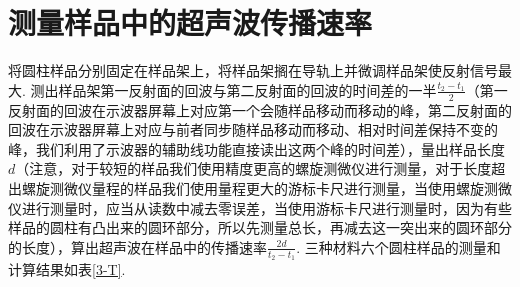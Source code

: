 \documentclass[UTF8,10pt,a4paper]{article}
\begin{document}
\section{测量样品中的超声波传播速率}
将圆柱样品分别固定在样品架上，将样品架搁在导轨上并微调样品架使反射信号最大. 测出样品架第一反射面的回波与第二反射面的回波的时间差的一半$\frac{t_2-t_1}{2}$（第一反射面的回波在示波器屏幕上对应第一个会随样品移动而移动的峰，第二反射面的回波在示波器屏幕上对应与前者同步随样品移动而移动、相对时间差保持不变的峰，我们利用了示波器的辅助线功能直接读出这两个峰的时间差），量出样品长度$d$（注意，对于较短的样品我们使用精度更高的螺旋测微仪进行测量，对于长度超出螺旋测微仪量程的样品我们使用量程更大的游标卡尺进行测量，当使用螺旋测微仪进行测量时，应当从读数中减去零误差，当使用游标卡尺进行测量时，因为有些样品的圆柱有凸出来的圆环部分，所以先测量总长，再减去这一突出来的圆环部分的长度），算出超声波在样品中的传播速率$\frac{2d}{t_2-t_1}$. 三种材料六个圆柱样品的测量和计算结果如表\ref{3-T}.
\end{document}
